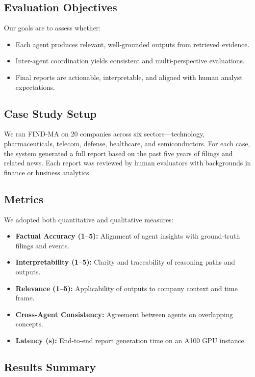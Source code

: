 \documentclass[11pt]{article}
\begin{document}
\subsection*{Evaluation Objectives}

Our goals are to assess whether:
\begin{itemize}
    \item Each agent produces relevant, well-grounded outputs from retrieved evidence.
    \item Inter-agent coordination yields consistent and multi-perspective evaluations.
    \item Final reports are actionable, interpretable, and aligned with human analyst expectations.
\end{itemize}

\subsection*{Case Study Setup}

We ran FIND-MA on 20 companies across six sectors—technology, pharmaceuticals, telecom, defense, healthcare, and semiconductors. For each case, the system generated a full report based on the past five years of filings and related news. Each report was reviewed by human evaluators with backgrounds in finance or business analytics.

\subsection*{Metrics}

We adopted both quantitative and qualitative measures:

\begin{itemize}
    \item \textbf{Factual Accuracy (1–5):} Alignment of agent insights with ground-truth filings and events.
    \item \textbf{Interpretability (1–5):} Clarity and traceability of reasoning paths and outputs.
    \item \textbf{Relevance (1–5):} Applicability of outputs to company context and time frame.
    \item \textbf{Cross-Agent Consistency:} Agreement between agents on overlapping concepts.
    \item \textbf{Latency (s):} End-to-end report generation time on an A100 GPU instance.
\end{itemize}

\subsection*{Results Summary}
\end{document}
